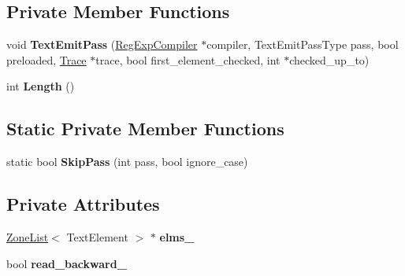 \subsection*{Private Member Functions}
\begin{DoxyCompactItemize}
\item 
void {\bfseries Text\+Emit\+Pass} (\hyperlink{classv8_1_1internal_1_1_reg_exp_compiler}{Reg\+Exp\+Compiler} $\ast$compiler, Text\+Emit\+Pass\+Type pass, bool preloaded, \hyperlink{classv8_1_1internal_1_1_trace}{Trace} $\ast$trace, bool first\+\_\+element\+\_\+checked, int $\ast$checked\+\_\+up\+\_\+to)\hypertarget{classv8_1_1internal_1_1_text_node_ac8b4f204115059de0f26acf64170d71f}{}\label{classv8_1_1internal_1_1_text_node_ac8b4f204115059de0f26acf64170d71f}

\item 
int {\bfseries Length} ()\hypertarget{classv8_1_1internal_1_1_text_node_aa7c992f50c0a1bba1a9b4cfd6f8eefcb}{}\label{classv8_1_1internal_1_1_text_node_aa7c992f50c0a1bba1a9b4cfd6f8eefcb}

\end{DoxyCompactItemize}
\subsection*{Static Private Member Functions}
\begin{DoxyCompactItemize}
\item 
static bool {\bfseries Skip\+Pass} (int pass, bool ignore\+\_\+case)\hypertarget{classv8_1_1internal_1_1_text_node_a0692b3127066c56906d1bb249b994736}{}\label{classv8_1_1internal_1_1_text_node_a0692b3127066c56906d1bb249b994736}

\end{DoxyCompactItemize}
\subsection*{Private Attributes}
\begin{DoxyCompactItemize}
\item 
\hyperlink{classv8_1_1internal_1_1_zone_list}{Zone\+List}$<$ Text\+Element $>$ $\ast$ {\bfseries elms\+\_\+}\hypertarget{classv8_1_1internal_1_1_text_node_a737a39de964977e693319e9145d4c4c5}{}\label{classv8_1_1internal_1_1_text_node_a737a39de964977e693319e9145d4c4c5}

\item 
bool {\bfseries read\+\_\+backward\+\_\+}\hypertarget{classv8_1_1internal_1_1_text_node_aabc9d77d70de3c9e08b5000c378834d0}{}\label{classv8_1_1internal_1_1_text_node_aabc9d77d70de3c9e08b5000c378834d0}

\end{DoxyCompactItemize}

